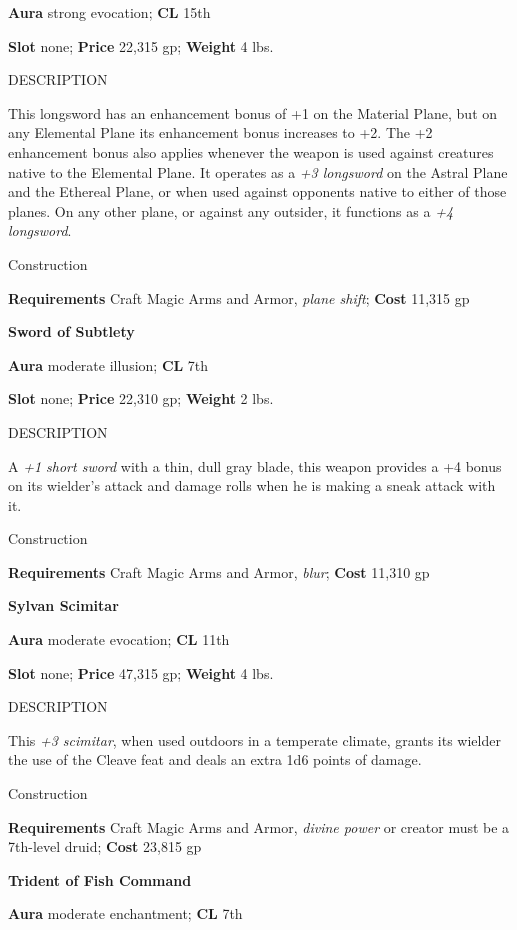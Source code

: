 \textbf{Aura} strong evocation;\textbf{ CL }15th
				
\textbf{Slot} none; \textbf{Price} 22,315 gp; \textbf{Weight} 4 lbs.
				
DESCRIPTION
				
This longsword has an enhancement bonus of +1 on the Material Plane, but on any Elemental Plane its enhancement bonus increases to +2. The +2 enhancement bonus also applies whenever the weapon is used against creatures native to the Elemental Plane. It operates as a \textit{+3 longsword} on the Astral Plane and the Ethereal Plane, or when used against opponents native to either of those planes. On any other plane, or against any outsider, it functions as a \textit{+4 longsword}. 
				
Construction
				
\textbf{Requirements} Craft Magic Arms and Armor, \textit{plane shift}; \textbf{Cost }11,315 gp
				
\textbf{Sword of Subtlety}
				
\textbf{Aura} moderate illusion;\textbf{ CL }7th
				
\textbf{Slot} none; \textbf{Price} 22,310 gp; \textbf{Weight} 2 lbs.
				
DESCRIPTION
				
A \textit{+1 short sword} with a thin, dull gray blade, this weapon provides a +4 bonus on its wielder's attack and damage rolls when he is making a sneak attack with it. 
				
Construction
				
\textbf{Requirements} Craft Magic Arms and Armor, \textit{blur}; \textbf{Cost }11,310 gp
				
\textbf{Sylvan Scimitar}
				
\textbf{Aura} moderate evocation;\textbf{ CL }11th
				
\textbf{Slot} none; \textbf{Price} 47,315 gp; \textbf{Weight} 4 lbs.
				
DESCRIPTION
				
This \textit{+3 scimitar}, when used outdoors in a temperate climate, grants its wielder the use of the Cleave feat and deals an extra 1d6 points of damage. 
				
Construction
				
\textbf{Requirements} Craft Magic Arms and Armor, \textit{divine power} or creator must be a 7th-level druid; \textbf{Cost }23,815 gp
				
\textbf{Trident of Fish Command}
				
\textbf{Aura} moderate enchantment;\textbf{ CL }7th
				
